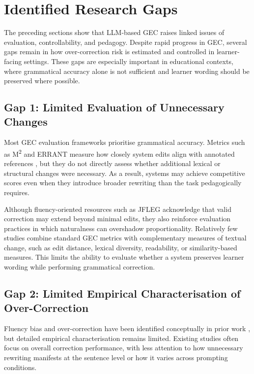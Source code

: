 \section{Identified Research Gaps}

The preceding sections show that LLM-based GEC raises linked issues of evaluation, controllability, and pedagogy. Despite rapid progress in GEC, several gaps remain in how over-correction risk is estimated and controlled in learner-facing settings. These gaps are especially important in educational contexts, where grammatical accuracy alone is not sufficient and learner wording should be preserved where possible.

\subsection{Gap 1: Limited Evaluation of Unnecessary Changes}

Most GEC evaluation frameworks prioritise grammatical accuracy. Metrics such as M\textsuperscript{2} and ERRANT measure how closely system edits align with annotated references \cite{dahlmeier-ng-2012-better,bryant-etal-2017-automatic}, but they do not directly assess whether additional lexical or structural changes were necessary. As a result, systems may achieve competitive scores even when they introduce broader rewriting than the task pedagogically requires.

Although fluency-oriented resources such as JFLEG \cite{napoles-etal-2017-jfleg} acknowledge that valid correction may extend beyond minimal edits, they also reinforce evaluation practices in which naturalness can overshadow proportionality. Relatively few studies combine standard GEC metrics with complementary measures of textual change, such as edit distance, lexical diversity, readability, or similarity-based measures. This limits the ability to evaluate whether a system preserves learner wording while performing grammatical correction.

\subsection{Gap 2: Limited Empirical Characterisation of Over-Correction}

Fluency bias and over-correction have been identified conceptually in prior work \cite{loem2023exploringeffectivenessgpt3grammatical}, but detailed empirical characterisation remains limited. Existing studies often focus on overall correction performance, with less attention to how unnecessary rewriting manifests at the sentence level or how it varies across prompting conditions.

